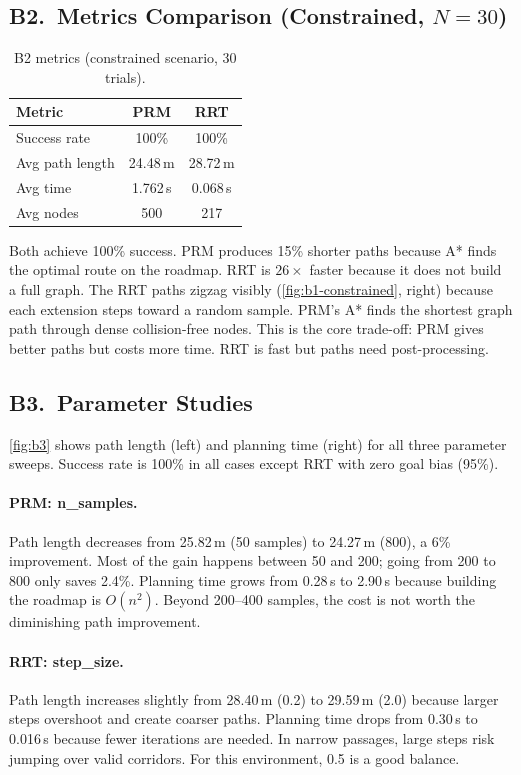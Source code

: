 \documentclass[10pt]{article}
\begin{document}
\subsection{B2.\ Metrics Comparison (Constrained, $N{=}30$)}

\begin{table}[ht]
\centering\small
\begin{tabular}{@{}lcc@{}}
\toprule
\textbf{Metric} & \textbf{PRM} & \textbf{RRT} \\
\midrule
Success rate & 100\% & 100\% \\
Avg path length & 24.48\,m & 28.72\,m \\
Avg time & 1.762\,s & 0.068\,s \\
Avg nodes & 500 & 217 \\
\bottomrule
\end{tabular}
\caption{B2 metrics (constrained scenario, 30 trials).}
\label{tab:b2}
\end{table}

Both achieve 100\% success. PRM produces 15\% shorter paths because A* finds the optimal route on the roadmap. RRT is $26\times$ faster because it does not build a full graph. The RRT paths zigzag visibly (\cref{fig:b1-constrained}, right) because each extension steps toward a random sample. PRM's A* finds the shortest graph path through dense collision-free nodes. This is the core trade-off: PRM gives better paths but costs more time. RRT is fast but paths need post-processing.

\subsection{B3.\ Parameter Studies}

\cref{fig:b3} shows path length (left) and planning time (right) for all three parameter sweeps. Success rate is 100\% in all cases except RRT with zero goal bias (95\%).

\paragraph{PRM: n\_samples.}
Path length decreases from 25.82\,m (50 samples) to 24.27\,m (800), a 6\% improvement. Most of the gain happens between 50 and 200; going from 200 to 800 only saves 2.4\%. Planning time grows from 0.28\,s to 2.90\,s because building the roadmap is $O(n^2)$. Beyond 200--400 samples, the cost is not worth the diminishing path improvement.

\paragraph{RRT: step\_size.}
Path length increases slightly from 28.40\,m (0.2) to 29.59\,m (2.0) because larger steps overshoot and create coarser paths. Planning time drops from 0.30\,s to 0.016\,s because fewer iterations are needed. In narrow passages, large steps risk jumping over valid corridors. For this environment, 0.5 is a good balance.
\end{document}

